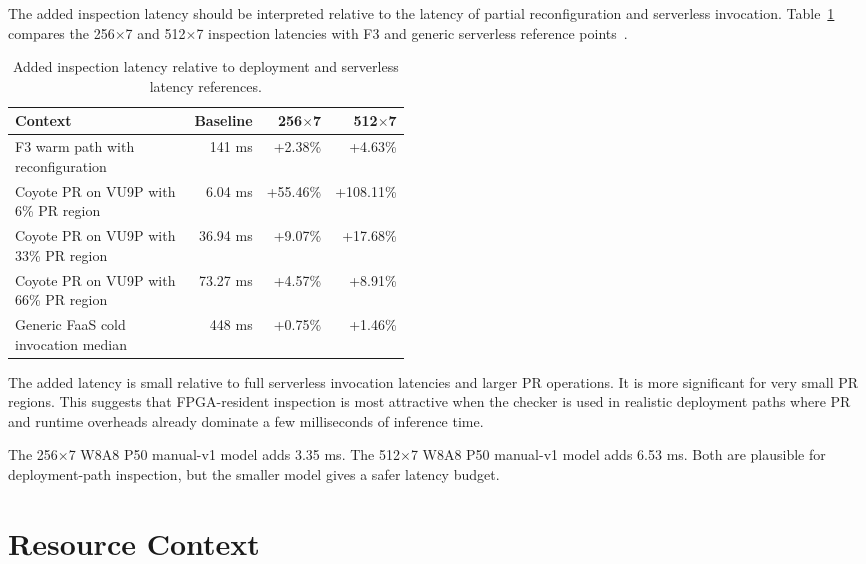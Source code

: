 The added inspection latency should be interpreted relative to the latency of partial reconfiguration and serverless invocation. Table~\ref{tab:latency-context} compares the 256$\times$7 and 512$\times$7 inspection latencies with F3 and generic serverless reference points~\cite{mainas2025f3,ustiugov2021stellar}.

\begin{table}[t]
    \centering
    \caption{Added inspection latency relative to deployment and serverless latency references.}
    \label{tab:latency-context}
    \begin{tabular}{p{0.46\linewidth} r r r}
        \toprule
        \textbf{Context} & \textbf{Baseline} & \textbf{256$\times$7} & \textbf{512$\times$7} \\
        \midrule
        F3 warm path with reconfiguration &
        141 ms &
        +2.38\% &
        +4.63\% \\
        \midrule
        Coyote PR on VU9P with 6\% PR region &
        6.04 ms &
        +55.46\% &
        +108.11\% \\
        \midrule
        Coyote PR on VU9P with 33\% PR region &
        36.94 ms &
        +9.07\% &
        +17.68\% \\
        \midrule
        Coyote PR on VU9P with 66\% PR region &
        73.27 ms &
        +4.57\% &
        +8.91\% \\
        \midrule
        Generic FaaS cold invocation median &
        448 ms &
        +0.75\% &
        +1.46\% \\
        \bottomrule
    \end{tabular}
\end{table}

The added latency is small relative to full serverless invocation latencies and larger PR operations. It is more significant for very small PR regions. This suggests that FPGA-resident inspection is most attractive when the checker is used in realistic deployment paths where PR and runtime overheads already dominate a few milliseconds of inference time.

The 256$\times$7 W8A8 P50 manual-v1 model adds 3.35 ms. The 512$\times$7 W8A8 P50 manual-v1 model adds 6.53 ms. Both are plausible for deployment-path inspection, but the smaller model gives a safer latency budget.

\section{Resource Context}
\label{sec:resource-context}

